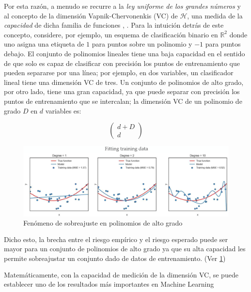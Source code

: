 Por esta raz\'on, a menudo se recurre a la \textit{ley uniforme de los grandes n\'umeros} y al concepto de la dimensi\'on Vapnik-Chervonenkis (VC) de $\mathcal{H} $, una medida de la \textit{capacidad} de dicha familia de funciones \cite{vapnik:1971}, \cite{mohri:2012}. Para la intuici\'on detr\'as de este concepto, considere, por ejemplo, un esquema de clasificaci\'on binario en $\mathbb{R} ^2$ donde uno asigna una etiqueta de $1$ para puntos sobre un polinomio y $-1$ para puntos debajo. El conjunto de polinomios lineales tiene una baja capacidad en el sentido de que solo es capaz de clasificar con precisi\'on los puntos de entrenamiento que pueden separarse por una l\'inea; por ejemplo, en dos variables, un clasificador lineal tiene una dimensi\'on VC de tres. Un conjunto de polinomios de alto grado, por otro lado, tiene una gran capacidad, ya que puede separar con precisi\'on los puntos de entrenamiento que se intercalan; la dimensi\'on VC de un polinomio de grado $D$ en $d$ variables es:

\begin{equation*}
\left(
\begin{array}{c}
d + D \\ 
d 
\end{array}
\right)
\end{equation*}

\begin{figure}[h]
	\label{gfx: overfitting}
	\centering
	\includegraphics[scale=.3]{gfx/overfitting.png}
	\caption{Fen\'omeno de sobreajuste en polinomios de alto grado}
\end{figure}


Dicho esto, la brecha entre el riesgo emp\'irico y el riesgo esperado puede ser mayor para un conjunto de polinomios de alto grado ya que su alta capacidad les permite sobreajustar un conjunto dado de datos de entrenamiento. (Ver \ref{gfx: overfitting})

Matem\'aticamente, con la capacidad de medici\'on de la dimensi\'on VC, se puede establecer uno de los resultados m\'as importantes en Machine Learning


